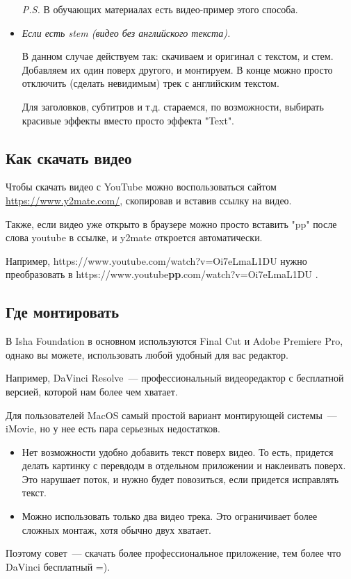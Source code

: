 \documentclass[
a4paper, %
12pt, %
article,
onecolumn, %
openany, %
]{memoir}
\begin{document}
\begin{itemize}
\begin{itemize}
    \end{itemize}
    \textit{P.S.} В обучающих материалах есть видео-пример этого способа.

\item \emph{Если есть stem (видео без английского текста).}
    
    В данном случае действуем так: скачиваем и оригинал с текстом,
    и стем. Добавляем их один поверх другого, и монтируем. В конце
    можно просто отключить (сделать невидимым) трек 
    с английским текстом.

    Для заголовков, субтитров и т.д. стараемся, по возможности,
    выбирать красивые эффекты вместо просто эффекта "Text".
\end{itemize}

\subsection{Как скачать видео} 
Чтобы скачать видео с YouTube можно воспользоваться сайтом
\href{https://www.y2mate.com/}{https://www.y2mate.com/}, скопировав и вставив 
ссылку на видео. 

Также, если видео уже открыто в браузере можно просто вставить "pp" после
слова youtube в ссылке, и y2mate откроется автоматически.

Например, https://www.youtube.com/watch?v=Oi7eLmaL1DU нужно преобразовать
в https://www.youtube\textbf{pp}.com/watch?v=Oi7eLmaL1DU .

\subsection{Где монтировать}
В Isha Foundation в основном используются Final Cut и Adobe Premiere Pro, 
однако вы можете, использовать любой удобный для вас редактор.

Например, DaVinci Resolve~---
профессиональный видеоредактор с бесплатной версией, которой нам более чем хватает. 

Для пользователей MacOS самый простой вариант монтирующей системы~--- 
iMovie, но у нее есть пара серьезных недостатков.
\begin{itemize}
    \item Нет возможности удобно добавить текст поверх видео.
        То есть, придется делать
        картинку с перевдодм в отдельном приложении и наклеивать поверх.
        Это нарушает поток, и нужно будет повозиться, если придется исправлять текст.
    \item Можно использовать только два видео трека. Это ограничивает более 
        сложных монтаж, хотя обычно двух хватает.
\end{itemize}
Поэтому совет~--- скачать более профессиональное приложение, тем более что
DaVinci бесплатный =).
\end{document}
